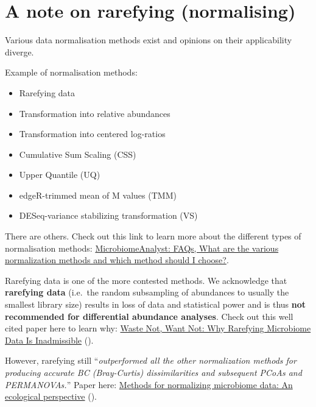 \documentclass[
]{book}
\providecommand{\tightlist}{%
  \setlength{\itemsep}{0pt}\setlength{\parskip}{0pt}}
\begin{document}
\hypertarget{a-note-on-rarefying-normalising}{%
\section{A note on rarefying (normalising)}\label{a-note-on-rarefying-normalising}}

Various data normalisation methods exist and opinions on their applicability diverge.

Example of normalisation methods:

\begin{itemize}
\tightlist
\item
  Rarefying data\\
\item
  Transformation into relative abundances
\item
  Transformation into centered log-ratios
\item
  Cumulative Sum Scaling (CSS)\\
\item
  Upper Quantile (UQ)\\
\item
  edgeR-trimmed mean of M values (TMM)\\
\item
  DESeq-variance stabilizing transformation (VS)
\end{itemize}

There are others. Check out this link to learn more about the different types of normalisation methods: \href{https://www.microbiomeanalyst.ca/MicrobiomeAnalyst/docs/FaqView.xhtml\#norm2}{MicrobiomeAnalyst: FAQs, What are the various normalization methods and which method should I choose?}.

Rarefying data is one of the more contested methods. We acknowledge that \textbf{rarefying data} (i.e.~the random subsampling of abundances to usually the smallest library size) results in loss of data and statistical power and is thus \textbf{not recommended for differential abundance analyses}. Check out this well cited paper here to learn why: \href{https://journals.plos.org/ploscompbiol/article?id=10.1371/journal.pcbi.1003531}{Waste Not, Want Not: Why Rarefying Microbiome Data Is Inadmissible} (\citet{McMurdie2014}).

However, rarefying still ``\emph{outperformed all the other normalization methods for producing accurate BC (Bray-Curtis) dissimilarities and subsequent PCoAs and PERMANOVAs.}'' Paper here: \href{https://doi.org/10.1111/2041-210X.13115}{Methods for normalizing microbiome data: An ecological perspective} (\citet{McKnight2019a}).
\end{document}
